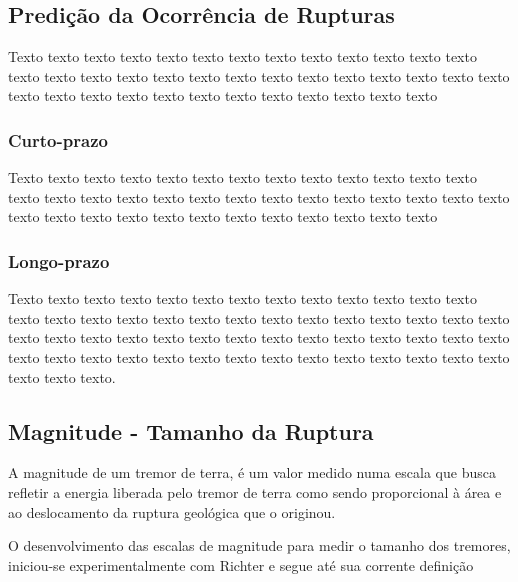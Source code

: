  
\subsection{Predição da Ocorrência de Rupturas}
\label{sec:fundamentos}

Texto texto texto texto texto texto texto texto texto texto texto texto texto
texto texto texto texto texto texto texto texto texto texto texto texto texto
texto texto texto texto texto texto texto texto texto texto texto texto texto


\subsubsection{Curto-prazo}
\label{sec:fundamentos}


Texto texto texto texto texto texto texto texto texto texto texto texto texto
texto texto texto texto texto texto texto texto texto texto texto texto texto
texto texto texto texto texto texto texto texto texto texto texto texto texto


\subsubsection{Longo-prazo}
\label{sec:fundamentos}

Texto texto texto texto texto texto texto texto texto texto texto texto texto
texto texto texto texto texto texto texto texto texto texto texto texto texto
texto texto texto texto texto texto texto texto texto texto texto texto texto
texto texto texto texto texto texto texto texto texto texto texto texto texto
texto texto texto texto texto texto.


 
\subsection{Magnitude - Tamanho da Ruptura}
\label{sec:risco_sismico}

A magnitude de um tremor de terra, é um valor medido numa escala que busca
refletir a energia liberada pelo tremor de terra como sendo proporcional à área
e ao deslocamento da ruptura geológica que o originou.

O desenvolvimento das escalas de magnitude para medir o tamanho dos tremores,
iniciou-se experimentalmente com Richter e segue até sua corrente definição



